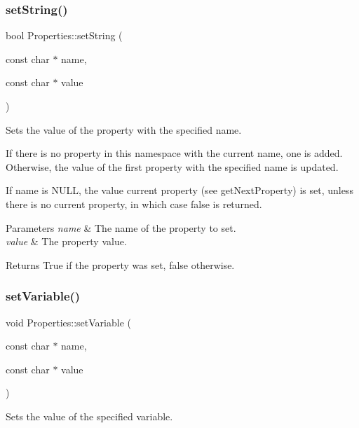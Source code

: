 \subsubsection{\texorpdfstring{set\+String()}{setString()}\hspace{0.1cm}{\footnotesize\ttfamily [2/2]}}
{\footnotesize\ttfamily bool Properties\+::set\+String (\begin{DoxyParamCaption}\item[{const char $\ast$}]{name,  }\item[{const char $\ast$}]{value }\end{DoxyParamCaption})}

Sets the value of the property with the specified name.

If there is no property in this namespace with the current name, one is added. Otherwise, the value of the first property with the specified name is updated.

If name is N\+U\+LL, the value current property (see get\+Next\+Property) is set, unless there is no current property, in which case false is returned.


\begin{DoxyParams}{Parameters}
{\em name} & The name of the property to set. \\
\hline
{\em value} & The property value.\\
\hline
\end{DoxyParams}
\begin{DoxyReturn}{Returns}
True if the property was set, false otherwise. 
\end{DoxyReturn}
\mbox{\label{classProperties_aea588dde95d1d4767d981a2530a202b0}} 
\subsubsection{\texorpdfstring{set\+Variable()}{setVariable()}\hspace{0.1cm}{\footnotesize\ttfamily [1/2]}}
{\footnotesize\ttfamily void Properties\+::set\+Variable (\begin{DoxyParamCaption}\item[{const char $\ast$}]{name,  }\item[{const char $\ast$}]{value }\end{DoxyParamCaption})}

Sets the value of the specified variable.


